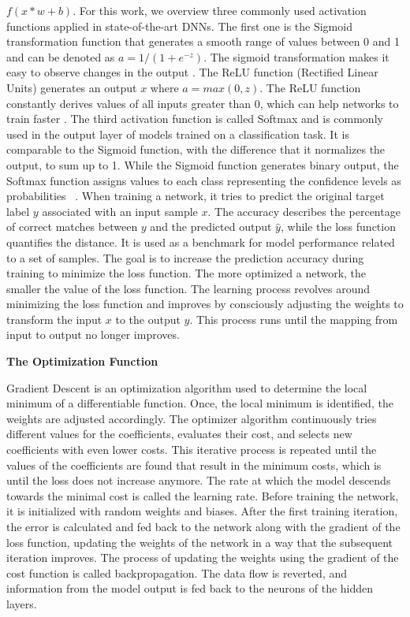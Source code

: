 $f(x*w+b)$.
For this work, we overview three commonly used activation functions applied in state-of-the-art DNNs. The first one is the Sigmoid transformation function that generates a smooth range of values between 0 and 1 and can be denoted as $a = 1 / (1 + e^{-z})$. The sigmoid transformation makes it easy to observe changes in the output \cite{han1995influence}. The ReLU function (Rectified Linear Units) generates an output $x$ where $a = max(0, z)$. The ReLU function constantly derives values of all inputs greater than 0, which can help networks to train faster \cite{glorot2011deep}. 
The third activation function is called Softmax and is commonly used in the output layer of models trained on a classification task. It is comparable to the Sigmoid function, with the difference that it normalizes the output, to sum up to 1. While the Sigmoid function generates binary output, the Softmax function assigns values to each class representing the confidence levels as probabilities ~\protect\cite{jang2016categorical}. When training a network, it tries to predict the original target label $y$ associated with an input sample $x$. The accuracy describes the percentage of correct matches between $y$ and the predicted output $\hat{y}$, while the loss function quantifies the distance. It is used as a benchmark for model performance related to a set of samples. The goal is to increase the prediction accuracy during training to minimize the loss function. The more optimized a network, the smaller the value of the loss function. 
The learning process revolves around minimizing the loss function and improves by consciously adjusting the weights to transform the input $x$ to the output $y$. This process runs until the mapping from input to output no longer improves. 

\textbf{The Optimization Function}

Gradient Descent is an optimization algorithm used to determine the local minimum of a differentiable function. 
Once, the local minimum is identified, the weights are adjusted accordingly.
The optimizer algorithm continuously tries different values for the coefficients, evaluates their cost, and selects new coefficients with even lower costs. This iterative process is repeated until the values of the coefficients are found that result in the minimum costs, which is until the loss does not increase anymore.
The rate at which the model descends towards the minimal cost is called the learning rate. Before training the network, it is initialized with random weights and biases. After the first training iteration, the error is calculated and fed back to the network along with the gradient of the loss function, updating the weights of the network in a way that the subsequent iteration improves. The process of updating the weights using the gradient of the cost function is called backpropagation. The data flow is reverted, and information from the model output is fed back to the neurons of the hidden layers.

